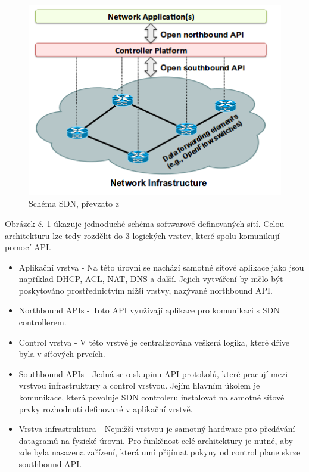 \begin{figure}[h]
\begin{centering}
\includegraphics[scale=0.60]{images/SDN}
\par\end{centering}
\caption{Schéma SDN, převzato z \cite{SDN_clanek}\label{fig:SDN}}
\end{figure}

Obrázek č. \ref{fig:SDN} úkazuje jednoduché schéma softwarově definovaných sítí. Celou architekturu lze tedy rozdělit do 3 logických vrstev, které spolu komunikují pomocí API. 

\begin{itemize}
\item Aplikační vrstva - Na této úrovni se nachází samotné síťové aplikace jako jsou například DHCP, ACL, NAT, DNS a další. Jejich vytváření by
mělo být poskytováno prostřednictvím nižší vrstvy, nazývané northbound API.
\item Northbound APIs - Toto API využívají aplikace pro komunikaci s SDN controllerem. 
\item Control vrstva - V této vrstvě je centralizována veškerá logika, které dříve byla v síťových prvcích.
\item Southbound APIs - Jedná se o skupinu API protokolů, které pracují mezi vrstvou infrastruktury a control vrstvou. Jejím hlavním úkolem je komunikace, která povoluje SDN controleru instalovat na samotné síťové prvky rozhodnutí definované v aplikační vrstvě.
\item Vrstva infrastruktura - Nejnižší vrstvou je samotný hardware pro předávání datagramů na fyzické úrovni. Pro funkčnost celé architektury je nutné, aby zde byla nasazena zařízení, která umí přijímat pokyny od control plane skrze southbound API.

\end{itemize}


